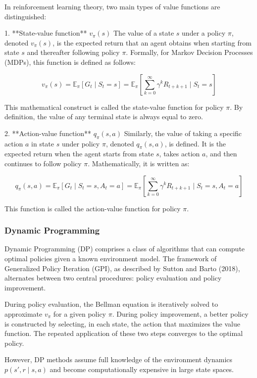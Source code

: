 In reinforcement learning theory, two main types of value functions are distinguished:

1. **State-value function** \(v_\pi(s)\)  
The value of a state \(s\) under a policy \(\pi\), denoted \(v_\pi(s)\), is the expected return that an agent obtains when starting from state \(s\) and thereafter following policy \(\pi\). Formally, for Markov Decision Processes (MDPs), this function is defined as follows:

\[
v_\pi(s) = \mathbb{E}_\pi \left[ G_t \mid S_t = s \right]
= \mathbb{E}_\pi \left[ \sum_{k=0}^{\infty} \gamma^k R_{t+k+1} \mid S_t = s \right]
\]

This mathematical construct is called the state-value function for policy \(\pi\). By definition, the value of any terminal state is always equal to zero.

2. **Action-value function** \(q_\pi(s,a)\)  
Similarly, the value of taking a specific action \(a\) in state \(s\) under policy \(\pi\), denoted \(q_\pi(s,a)\), is defined. It is the expected return when the agent starts from state \(s\), takes action \(a\), and then continues to follow policy \(\pi\). Mathematically, it is written as:

\[
q_\pi(s,a) = \mathbb{E}_\pi \left[ G_t \mid S_t = s, A_t = a \right]
= \mathbb{E}_\pi \left[ \sum_{k=0}^{\infty} \gamma^k R_{t+k+1} \mid S_t = s, A_t = a \right]
\]

This function is called the action-value function for policy \(\pi\).

\subsubsection{Dynamic Programming}

Dynamic Programming (DP) comprises a class of algorithms that can compute optimal policies given a known environment model. The framework of Generalized Policy Iteration (GPI), as described by Sutton and Barto (2018), alternates between two central procedures: policy evaluation and policy improvement.

During policy evaluation, the Bellman equation is iteratively solved to approximate \(v_\pi\) for a given policy \(\pi\). During policy improvement, a better policy is constructed by selecting, in each state, the action that maximizes the value function. The repeated application of these two steps converges to the optimal policy.

However, DP methods assume full knowledge of the environment dynamics \(p(s', r \mid s, a)\) and become computationally expensive in large state spaces.

